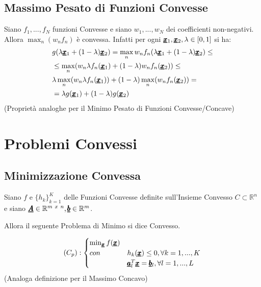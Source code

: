 \subsection{Massimo Pesato di Funzioni Convesse}
Siano $f_1,...,f_N$ funzioni Convesse e siano $w_1,...,w_N$ dei coefficienti non-negativi.
Allora $\max_n(w_n f_n)$ è convessa.
Infatti per ogni $\pmb{\underline{x}}_1, \pmb{\underline{x}}_2, \lambda \in [0,1]$ si ha:
\begin{equation*}
\begin{aligned}
        &g(\lambda \pmb{\underline{x}}_1 +(1 - \lambda)\pmb{\underline{x}}_2 ) = \max_n w_n f_n (\lambda \pmb{\underline{x}}_1 +(1 - \lambda)\pmb{\underline{x}}_2 ) \leq \\
        &\leq \max_n(w_n \lambda f_n(\pmb{\underline{x}}_1) + (1 - \lambda)w_n f_n(\pmb{\underline{x}}_2)) \leq \\
        &\lambda \max_n(w_n \lambda f_n(\pmb{\underline{x}}_1)) + (1 - \lambda) \max_n(w_n f_n(\pmb{\underline{x}}_2)) = \\
        &= \lambda g(\pmb{\underline{x}}_1) + (1 - \lambda) g(\pmb{\underline{x}}_2)
\end{aligned}
\end{equation*}
(Proprietà analoghe per il Minimo Pesato di Funzioni Convesse/Concave)


\section{Problemi Convessi}
\subsection{Minimizzazione Convessa}
Siano $f$ e $\{h_k\}^K_{k=1}$ delle Funzioni Convesse definite sull'Insieme Convesso $C \subset \mathbb{R}^n$ e siano $\pmb{\underline{A}} \in \mathbb{R}^{m \ x \ n}, \pmb{\underline{b}} \in \mathbb{R}^m$.\\ 
\begin{center}
    Allora il seguente Problema di Minimo si dice Convesso.
\end{center}

\begin{equation*}
    (C_p): \begin{cases}
    \min_{\pmb{\underline{x}}} f(\pmb{\underline{x}}) \\
    con &h_k(\pmb{\underline{x}}) \leq 0, \forall k = 1,...,K\\
    & \pmb{\underline{a}}^T_l\pmb{\underline{x}} = \pmb{\underline{b}}_l, \forall l = 1,..., L
    \end{cases}
\end{equation*}
(Analoga definizione per il Massimo Concavo)

